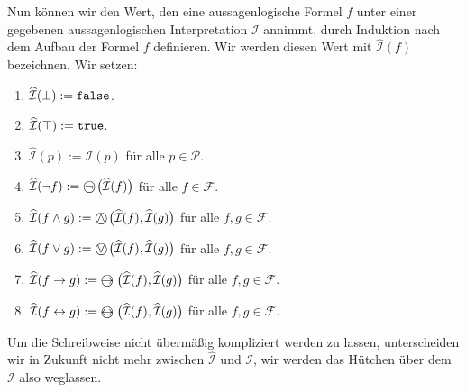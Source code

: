 \begin{table}[!ht]
  \centering
{}
  \caption{Interpretation der Junktoren.}
  \label{tab:aussagen-logik}
\end{table}
Nun k\"{o}nnen wir den Wert, den eine aussagenlogische Formel $f$ unter einer gegebenen
aussagenlogischen Interpretation $\mathcal{I}$ annimmt, durch Induktion nach dem Aufbau
der Formel $f$ definieren.  Wir werden diesen Wert mit $\widehat{\mathcal{I}}(f)$
bezeichnen.  Wir setzen:
\begin{enumerate}
\item $\widehat{\mathcal{I}}(\bot) := \mathtt{false}$.
\item $\widehat{\mathcal{I}}(\top) := \mathtt{true}$.
\item $\widehat{\mathcal{I}}(p) := \mathcal{I}(p)$ f\"{u}r alle $p \in \mathcal{P}$.
\item $\widehat{\mathcal{I}}(\neg f) := \circneg\;\bigl(\widehat{\mathcal{I}}(f)\bigr)$ f\"{u}r alle $f \in \mathcal{F}$.
\item $\widehat{\mathcal{I}}(f \wedge g) := \circwedge\;\bigl(\widehat{\mathcal{I}}(f), \widehat{\mathcal{I}}(g)\bigr)$ 
      f\"{u}r alle $f, g \in \mathcal{F}$.
\item $\widehat{\mathcal{I}}(f \vee g) := \circvee\;\bigl(\widehat{\mathcal{I}}(f), \widehat{\mathcal{I}}(g)\bigr)$ 
      f\"{u}r alle $f, g \in \mathcal{F}$.
\item $\widehat{\mathcal{I}}(f \rightarrow g) := \circright\;\bigl(\widehat{\mathcal{I}}(f), \widehat{\mathcal{I}}(g)\bigr)$ 
      f\"{u}r alle $f, g \in \mathcal{F}$.
\item $\widehat{\mathcal{I}}(f \leftrightarrow g) := \circleftright\;\bigl(\widehat{\mathcal{I}}(f), \widehat{\mathcal{I}}(g)\bigr)$ 
      f\"{u}r alle $f, g \in \mathcal{F}$.
\end{enumerate}
Um die Schreibweise nicht \"{u}berm\"{a}\ss{}ig kompliziert werden zu lassen, unterscheiden wir in
Zukunft nicht  mehr zwischen $\widehat{\mathcal{I}}$ und $\mathcal{I}$, wir werden das H\"{u}tchen \"{u}ber dem
$\mathcal{I}$ also weglassen.

